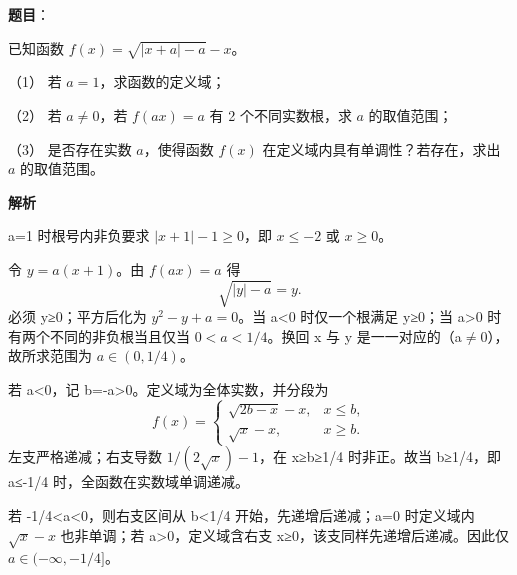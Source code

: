 \begin{answer}

\textbf{题目}：

已知函数 $f(x)=\sqrt{|x+a|-a}-x$。

（1） 若 $a=1$，求函数的定义域；

（2） 若 $a\ne0$，若 $f(ax)=a$ 有 2 个不同实数根，求 $a$ 的取值范围；

（3） 是否存在实数 $a$，使得函数 $f(x)$ 在定义域内具有单调性？若存在，求出 $a$ 的取值范围。

\textbf{解析}


a=1 时根号内非负要求 \(|x+1|-1\ge0\)，即 \(x\le-2\) 或 \(x\ge0\)。


令 \(y=a(x+1)\)。由 \(f(ax)=a\) 得
\nopagebreak[4]
\[
\sqrt{|y|-a}=y.
\]
必须 y≥0；平方后化为 \(y^2-y+a=0\)。当 a<0 时仅一个根满足 y≥0；当 a>0 时有两个不同的非负根当且仅当 \(0<a<1/4\)。换回 x 与 y 是一一对应的（a$\neq$0），故所求范围为 \(a\in(0,1/4)\)。


若 a<0，记 b=-a>0。定义域为全体实数，并分段为
\nopagebreak[4]
\[
f(x)=
\begin{cases}
\sqrt{2b-x}-x,&x\le b,\\
\sqrt x-x,&x\ge b.
\end{cases}
\]
左支严格递减；右支导数 \(1/(2\sqrt x)-1\)，在 x≥b≥1/4 时非正。故当 b≥1/4，即 a≤-1/4 时，全函数在实数域单调递减。

若 -1/4<a<0，则右支区间从 b<1/4 开始，先递增后递减；a=0 时定义域内 \(\sqrt x-x\) 也非单调；若 a>0，定义域含右支 x≥0，该支同样先递增后递减。因此仅 \(a\in(-\infty,-1/4]\)。

\gkanswer{答案（1）：$(-\infty,-2]\cup[0,+\infty)$}


\gkanswer{答案（3）：$a\in(-\infty,-\dfrac14]$}

\end{answer}

